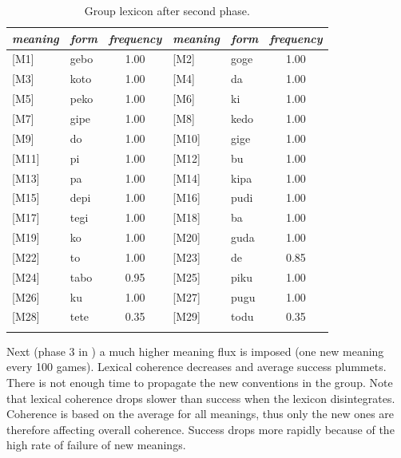 \begin{table}
\begin{center}
\begin{tabular}{ l  l  c  l  l  c } \lsptoprule 
{\itshape meaning} & {\itshape form} & {\itshape frequency} & {\itshape meaning} & {\itshape form} & {\itshape frequency}\\ \midrule 
{}[M1]& gebo & 1.00 & [M2]& goge & 1.00 \\  
{}[M3]& koto & 1.00 & [M4]& da & 1.00 \\  
{}[M5]& peko & 1.00 & [M6]& ki & 1.00 \\  
{}[M7]& gipe & 1.00 & [M8]& kedo & 1.00 \\  
{}[M9]& do & 1.00 & [M10]& gige & 1.00 \\  
{}[M11]& pi & 1.00 & [M12]& bu & 1.00 \\  
{}[M13]& pa & 1.00 & [M14]& kipa & 1.00 \\  
{}[M15]& depi & 1.00 & [M16]& pudi & 1.00 \\  
{}[M17]& tegi & 1.00 & [M18]& ba & 1.00 \\  
{}[M19]& ko & 1.00 & [M20]& guda & 1.00 \\  
{}[M22]& to & 1.00 & [M23]& de & 0.85 \\  
{}[M24]& tabo & 0.95 & [M25]& piku & 1.00 \\  
{}[M26]& ku & 1.00 & [M27]& pugu & 1.00 \\  
{}[M28]& tete & 0.35 & [M29]& todu & 0.35 \\  
\lspbottomrule
\end{tabular}
\caption{\label{tab:phase1} Group lexicon after second phase.}
\end{center}
\end{table}
Next (phase 3 in ) a much higher 
meaning flux is imposed (one new meaning every 100 games). 
Lexical coherence decreases and
average success plummets. There is not enough time to propagate
the new conventions in the group. 
Note that lexical coherence drops slower than 
success when the lexicon disintegrates. 
Coherence is based on the average for all 
meanings, thus only the new ones are therefore affecting overall coherence. 
Success drops more rapidly 
because of the high rate of failure of new meanings. 

